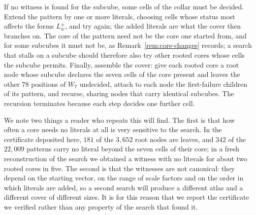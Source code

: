 \documentclass[11pt]{article}
\theoremstyle{definition}
\begin{document}
If no witness is found for the subcube, some cells of the collar must be
decided.  Extend the pattern by one or more literals, choosing cells whose
status most affects the forms $L^{\pm}_{w}$, and try again; the added
literals are what the cover then branches on.  The core of the pattern need
not be the core one started from, and for some subcubes it must not be, as
Remark~\ref{rem:core-changes} records; a search that stalls on a subcube
should therefore also try other rooted cores whose cells the subcube permits.
Finally, assemble the cover: give each rooted core a root node whose subcube
declares the seven cells of the core present and leaves the other $78$
positions of $W_7$ undecided, attach to each node the first-failure children
of its pattern, and recurse, sharing nodes that carry identical subcubes.
The recursion terminates because each step decides one further cell.

We note two things a reader who repeats this will find.  The first is that
how often a core needs no literals at all is very sensitive to the search.
In the certificate deposited here, $181$ of the $3{,}652$ root nodes are
leaves, and $342$ of the $22{,}009$ patterns carry no literal beyond the seven
cells of their core; in a fresh reconstruction of the search we obtained a
witness with no literals for about two rooted cores in five.  The second is
that the witnesses are not canonical: they depend on the starting vector, on
the range of scale factors and on the order in which literals are added, so a
second search will produce a different atlas and a different cover of
different sizes.  It is for this reason that we report the certificate we verified
rather than any property of the search that found it.
\end{document}
